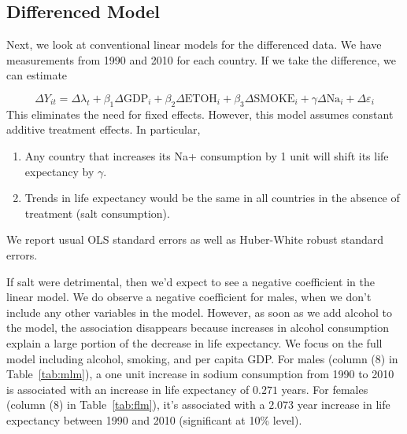 \documentclass[11pt]{article}\usepackage[]{graphicx}\usepackage[]{color}
\newcommand{\eps}{\varepsilon}
\begin{document}
\subsection{Differenced Model}
Next, we look at conventional linear models for the differenced data. 
We have measurements from 1990 and 2010 for each country.
If we take the difference, we can estimate

$$\Delta Y_{it} =  \Delta \lambda_t + \beta_1\Delta \text{GDP}_{i} +  \beta_2\Delta \text{ETOH}_{i} +  \beta_3\Delta \text{SMOKE}_{i} + \gamma\Delta \text{Na}_{i} + \Delta \eps_{i}$$
This eliminates the need for fixed effects.
However, this model assumes constant additive treatment effects.
In particular,
\begin{enumerate}
\item Any country that increases its Na+ consumption by 1 unit will shift its life expectancy by $\gamma$.
\item Trends in life expectancy would be the same in all countries in the absence of treatment (salt consumption).
\end{enumerate}

We report usual OLS standard errors as well as Huber-White robust standard errors.

If salt were detrimental, then we'd expect to see a negative coefficient in the linear model.
We do observe a negative coefficient for males, when we don't include any other variables in the model.
However, as soon as we add alcohol to the model, the association disappears because increases in alcohol consumption explain a large portion of the decrease in life expectancy.
We focus on the full model including alcohol, smoking, and per capita GDP.
For males (column (8) in Table~\ref{tab:mlm}), a one unit increase in sodium consumption from 1990 to 2010 is associated with an increase in life expectancy of $0.271$ years.
For females (column (8) in Table~\ref{tab:flm}), it's associated with a $2.073$ year increase in life expectancy between 1990 and 2010 (significant at 10\% level).
\end{document}
